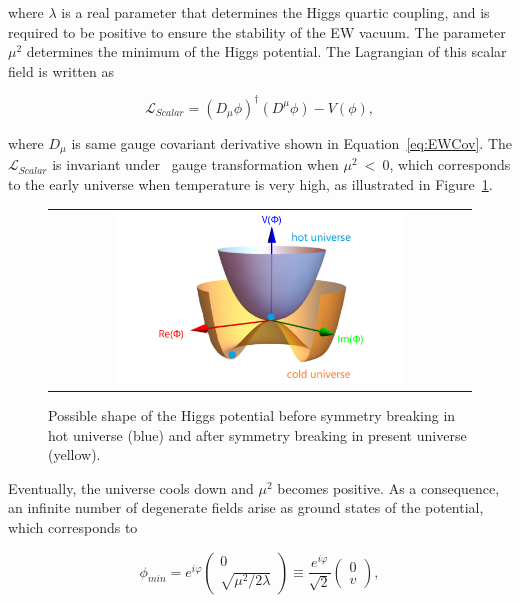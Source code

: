 where $\lambda$ is a real parameter that determines the Higgs quartic coupling, and is required to be positive to ensure the stability of the \ac{EW} vacuum. The parameter $\mu^2$ determines the minimum of the Higgs potential. The Lagrangian of this scalar field is written as 

\begin{equation}
\mathcal{L}_{Scalar}=(D_{\mu}\phi)^{\dagger}(D^{\mu}\phi)-V(\phi),
\end{equation}

where $D_{\mu}$ is same gauge covariant derivative shown in Equation~\ref{eq:EWCov}. The $\mathcal{L}_{Scalar}$ is invariant under \ew~gauge transformation when $\mu^2~<~0$, which corresponds to the early universe when temperature is very high, as illustrated in Figure~\ref{fig:HiggsPotential}.

\begin{figure}[tbh!]
 \begin{center}
 \begin{tabular}{c}
 \includegraphics[width=0.7\textwidth]{figures/Part1/SM/HiggsPotential}
 \end{tabular}
 \caption{Possible shape of the Higgs potential before symmetry breaking in hot universe (blue) and after symmetry breaking in present universe (yellow).~\cite{universe9040178}}
 \label{fig:HiggsPotential}
 \end{center}
\end{figure}

Eventually, the universe cools down and $\mu^2$ becomes positive. As a consequence, an infinite number of degenerate fields arise as ground states of the potential, which corresponds to 

\begin{equation}
\phi_{min}=e^{i\varphi}\begin{pmatrix}0\\\sqrt{\mu^2/2\lambda}\end{pmatrix}\equiv\frac{e^{i\varphi}}{\sqrt{2}}\begin{pmatrix}0\\v\end{pmatrix},
\end{equation}

